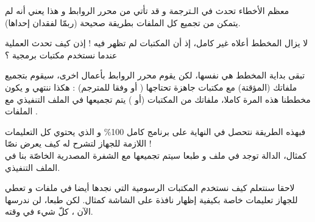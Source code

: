 معظم الأخطاء تحدث في الـترجمة و قد تأتي من محرر الروابط و هذا يعني أنه لم يتمكن من تجميع كل الملفات
بطريقة صحيحة (ربمّا لفقدان إحداها).

لا يزال المخطط أعلاه غير كامل، إذ أن المكتبات لم تظهر فيه ! إذن كيف تحدث العملية عندما نستخدم مكتبات برمجية ؟

تبقى بداية المخطط هي نفسها، لكن يقوم محرر الروابط بأعمال اخرى، سيقوم بتجميع ملفاتك
(المؤقتة) مع مكتبات جاهزة تحتاجها (
أو
وفقا للمترجم) :
هكذا ننتهي و يكون مخططنا هذه المرة كاملا، ملفاتك من المكتبات
(أو
)
يتم تجميعها في الملف التنفيذي مع الملفات
.

فبهذه الطريقة نتحصل في النهاية على برنامج كامل
100\%
و الذي يحتوي كل التعليمات اللازمة للجهاز لتشرح له كيف يعرض نصّا !\\
كمثال، الدالة
توجد في ملف
و طبعا سيتم تجميعها مع الشفرة المصدرية الخاصّة بنا في الملف التنفيذي.

لاحقا سنتعلم كيف نستخدم المكتبات الرسومية التي نجدها أيضا في ملفات
و تعطي للجهاز تعليمات خاصة بكيفية إظهار نافذة على الشاشة كمثال. لكن طبعا، لن ندرسها الآن ، كلّ شيء في وقته.
